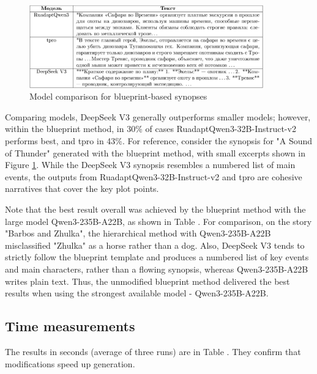 \documentclass{superfri}
\begin{document}
\begin{figure}[ht!]
  \centering
  \includegraphics[width=0.9\textwidth]{figures/three_ref.png}
  \caption{Model comparison for blueprint-based synopses}
  \label{fig:bl_ref}
\end{figure}

Comparing models, DeepSeek V3 generally outperforms smaller models; however, within the blueprint method, in 30\% of cases
RuadaptQwen3-32B-Instruct-v2 performs best, and tpro in 43\%. For reference, consider the synopsis for "A Sound of Thunder" generated with the blueprint method,
with small excerpts shown in Figure \ref{fig:bl_ref}.
While the DeepSeek V3 synopsis resembles a numbered list of main events,
the outputs from RuadaptQwen3-32B-Instruct-v2 and tpro are cohesive narratives that cover the key plot points.

Note that the best result overall was achieved by the blueprint method with the large model Qwen3-235B-A22B,
as shown in Table . For comparison, on the story "Barbos and Zhulka",
the hierarchical method with Qwen3-235B-A22B misclassified "Zhulka" as a horse rather than a dog. Also, DeepSeek V3 tends to strictly follow the blueprint template and produces a numbered list
of key events and main characters, rather than a flowing synopsis, whereas Qwen3-235B-A22B writes plain text.
Thus, the unmodified blueprint method delivered the best results when using the strongest available model - Qwen3-235B-A22B.

\subsection{Time measurements}
The results in seconds (average of three runs) are in Table .
They confirm that modifications speed up generation.
\end{document}
